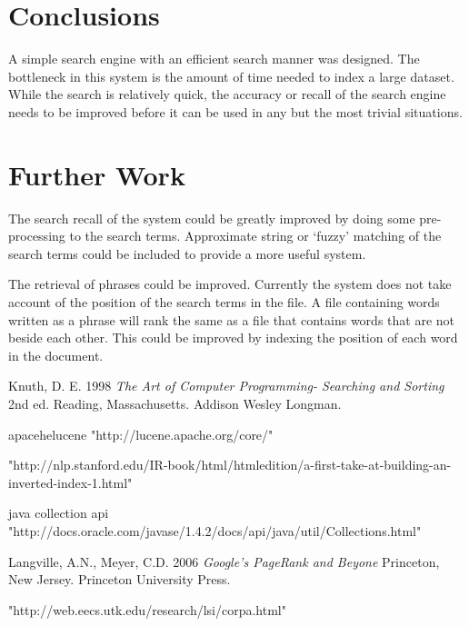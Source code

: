 \documentclass[12pt, a4paper,oneside,twocolumn]{article}
\begin{document}
\section{Conclusions}
A simple search engine with an efficient search manner was designed. The bottleneck in this system is the amount of time needed to index a large dataset. While the search is relatively quick, the accuracy or recall of the search engine needs to be improved before it can be used in any but the most trivial situations.


\section{Further Work}

The search recall of the system could be greatly improved by doing some pre-processing to the search terms. Approximate string or `fuzzy' matching of the search terms could be included to provide a more useful system.

The retrieval of phrases could be improved. Currently the system does not take account of the position of the search terms in the file. A file containing words written as a phrase will rank the same as a file that contains words that are not beside each other. This could be improved by indexing the position of each word in the document.

\begin{thebibliography}{9}
Knuth, D. E. 1998 \emph{The Art of Computer Programming- Searching and Sorting} 2nd ed. Reading, Massachusetts. Addison Wesley Longman.

apacehelucene
"http://lucene.apache.org/core/"

"http://nlp.stanford.edu/IR-book/html/htmledition/a-first-take-at-building-an-inverted-index-1.html"

java collection api
"http://docs.oracle.com/javase/1.4.2/docs/api/java/util/Collections.html"

Langville, A.N., Meyer, C.D. 2006 \emph{Google's PageRank and Beyone} Princeton, New Jersey. Princeton University Press.

"http://web.eecs.utk.edu/research/lsi/corpa.html"

\end{thebibliography}
\end{document}
